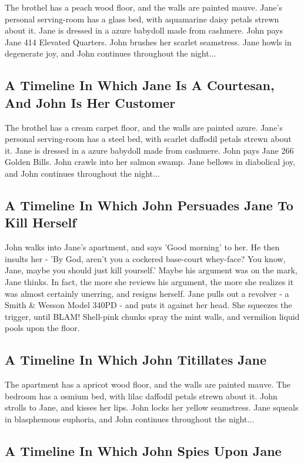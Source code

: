 \documentclass{article}
\begin{document}
The brothel has a peach wood floor, and the walls are painted mauve.
Jane's personal serving{-}room has a glass bed, with aquamarine daisy petals strewn about it.
Jane is dressed in a azure babydoll made from cashmere.
John pays Jane 414 Elevated Quarters.
John brushes her scarlet seamstress.
Jane howls in degenerate joy, and John continues throughout the night...
\subsection{A Timeline In Which Jane Is A Courtesan, And John Is Her Customer}


The brothel has a cream carpet floor, and the walls are painted azure.
Jane's personal serving{-}room has a steel bed, with scarlet daffodil petals strewn about it.
Jane is dressed in a azure babydoll made from cashmere.
John pays Jane 266 Golden Bills.
John crawls into her salmon swamp.
Jane bellows in diabolical joy, and John continues throughout the night...
\subsection{A Timeline In Which John Persuades Jane To Kill Herself}


John walks into Jane's apartment, and says 'Good morning' to her.
He then insults her {-} 'By God, aren't you a cockered base{-}court whey{-}face?
You know, Jane, maybe you should just kill yourself.'
Maybe his argument was on the mark, Jane thinks.
In fact, the more she reviews his argument, the more she realizes it was almost certainly unerring, and resigns herself.
Jane pulls out a revolver {-} a Smith \& Wesson Model 340PD {-} and puts it against her head.
She squeezes the trigger, until BLAM!
Shell{-}pink chunks spray the mint walls, and vermilion liquid pools upon the floor.
\subsection{A Timeline In Which John Titillates Jane}


The apartment has a apricot wood floor, and the walls are painted mauve.
The bedroom has a osmium bed, with lilac daffodil petals strewn about it.
John strolls to Jane, and kisses her lips.
John locks her yellow seamstress.
Jane squeals in blasphemous euphoria, and John continues throughout the night...
\subsection{A Timeline In Which John Spies Upon Jane}
\end{document}
